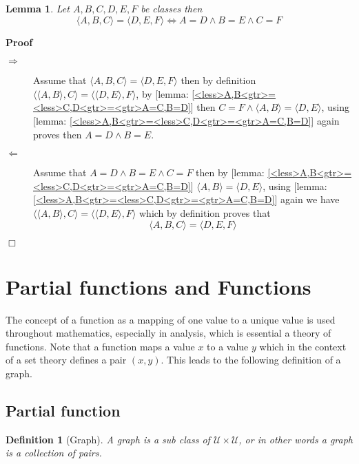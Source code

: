 \documentclass{book}
\newcommand{\tmtextbf}[1]{\text{{\bfseries{#1}}}}
\newenvironment{proof}{\noindent\textbf{Proof\ }}{\hspace*{\fill}$\Box$\medskip}
\newtheorem{definition}{Definition}
{\theorembodyfont{\rmfamily}\newtheorem{example}{Example}}
\newtheorem{lemma}{Lemma}
\begin{document}
\begin{lemma}
  \label{<less>A,B,C<gtr>=<less>D,E,F<gtr>=<gtr>A=E,B=D,C=F}Let $A, B, C, D,
  E, F$ be classes then
  \[ \langle A, B, C \rangle = \langle D, E, F \rangle \Leftrightarrow A = D
     \wedge B = E \wedge C = F \]
\end{lemma}

\begin{proof}
  
  \begin{description}
    \item[$\Rightarrow$] Assume that $\langle A, B, C \rangle = \langle D, E,
    F \rangle$ then by definition $\langle \langle A, B \rangle, C \rangle =
    \langle \langle D, E \rangle, F \rangle$, by [lemma:
    \ref{<less>A,B<gtr>=<less>C,D<gtr>=<gtr>A=C,B=D}] then $C = F \wedge
    \langle A, B \rangle = \langle D, E \rangle$, using [lemma:
    \ref{<less>A,B<gtr>=<less>C,D<gtr>=<gtr>A=C,B=D}] again proves then $A = D
    \wedge B = E$.
    
    \item[$\Leftarrow$] Assume that $A = D \wedge B = E \wedge C = F$ then by
    [lemma: \ref{<less>A,B<gtr>=<less>C,D<gtr>=<gtr>A=C,B=D}] $\langle A, B
    \rangle = \langle D, E \rangle$, using [lemma:
    \ref{<less>A,B<gtr>=<less>C,D<gtr>=<gtr>A=C,B=D}] again we have $\langle
    \langle A, B \rangle, C \rangle = \langle \langle D, E \rangle, F \rangle$
    which by definition proves that
    \[ \langle A, B, C \rangle = \langle D, E, F \rangle \]
  \end{description}
\end{proof}

\section{Partial functions and Functions}

The concept of a function as a mapping of one value to a unique value is used
throughout mathematics, especially in analysis, which is essential a theory of
functions. Note that a function maps a value $x$ to a \tmtextbf{unique} value
$y$ which in the context of a set theory defines a pair $(x, y)$. This leads
to the following definition of a graph.

\subsection{Partial function}

\begin{definition}[Graph]
  \label{parttial function graph}A graph is a sub class of $\mathcal{U} \times
  \mathcal{U}$, or in other words a graph is a collection of pairs.
\end{definition}
\end{document}
